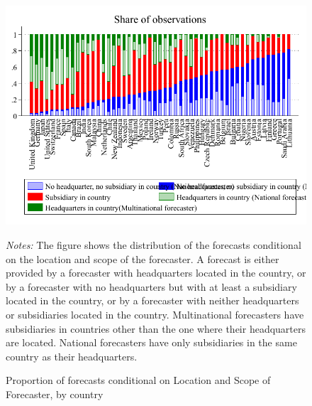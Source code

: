\documentclass[letterpaper,12pt]{article}
\newenvironment{fignote}{\footnotesize \begin{singlespace} \noindent}{\end{singlespace} \par }
\begin{document}
\begin{figure}[H]
\begin{center}
		\includegraphics[width=.9\linewidth]{../output/figures/hq_sub_obs_by_cty.pdf}
\end{center}
	\caption{Proportion of forecasts conditional on Location and Scope of Forecaster, by country}
	\label{fig:hq_sub_obs_by_cty}
	\begin{fignote}
		\textit{Notes:} The figure shows the distribution of the forecasts conditional on the location and scope of the forecaster. A forecast is either provided by a forecaster with headquarters located in the country, or by a forecaster with no headquarters but with at least a subsidiary located in the country, or by a forecaster with neither headquarters or subsidiaries located in the country. Multinational forecasters have subsidiaries in countries other than the one where their headquarters are located. National forecasters have only subsidiaries in the same country as their headquarters.
	\end{fignote}
\end{figure}
\end{document}
